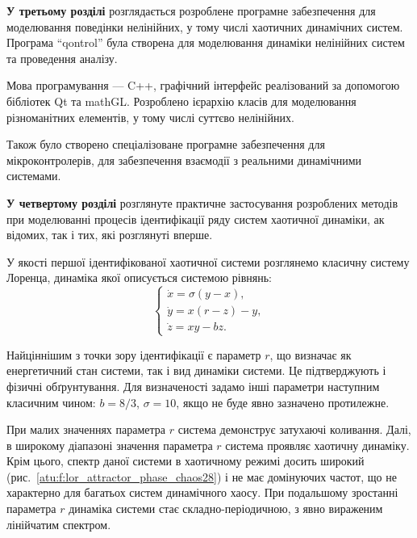 \documentclass[a4paper,13pt]{atuaref}
\begin{document}
\medskip
\textbf{У третьому розділі}
розглядається розроблене програмне
забезпечення
для моделювання
поведінки  нелінійних,
у тому числі хаотичних динамічних систем.
Програма ``qontrol'' була створена для моделювання динаміки
нелінійних систем та проведення аналізу.

Мова програмування --- C++,
графічний інтерфейс реалізований за допомогою
бібліотек Qt та mathGL.
Розроблено ієрархію класів для
моделювання різноманітних елементів,
у тому числі суттєво нелінійних.

Також було створено спеціалізоване
програмне забезпечення для мікроконтролерів,
для забезпечення взаємодії
з реальними динамічними системами.


\textbf{У четвертому розділі}
розглянуте практичне застосування розроблених методів при моделюванні
процесів ідентифікації ряду систем хаотичної динаміки,
ак відомих, так і тих, які розглянуті вперше.

У якості першої ідентифікованої хаотичної системи розглянемо класичну систему
Лоренца, динаміка якої описується системою рівнянь:
%
\begin{equation}
\begin{cases}
  \dot{x} = \sigma (y-x ) , \\
  \dot{y} = x (r-z) - y , \\
  \dot{z} = x y - b z .
\end{cases}
\label{atu:eq:lor}
\end{equation}

Найціннішим з точки зору ідентифікації є параметр $r$, що визначає як
енергетичний стан системи, так і вид динаміки системи. Це підтверджують і
фізичні обґрунтування. Для визначеності задамо інші параметри наступним
класичним чином: $b = 8/3$, $\sigma = 10$, якщо не буде явно
зазначено протилежне.

При малих значеннях параметра $r$ система демонструє затухаючі коливання.
Далі, в широкому діапазоні значення параметра $r$ система проявляє хаотичну
динаміку. Крім цього, спектр даної системи в хаотичному режимі досить широкий
(рис.~\ref{atu:f:lor_attractor_phase_chaos28}) і не має домінуючих
частот, що не характерно для багатьох систем динамічного хаосу.
При подальшому зростанні параметра $r$ динаміка системи стає
складно-періодичною, з явно вираженим лінійчатим спектром.
\end{document}
